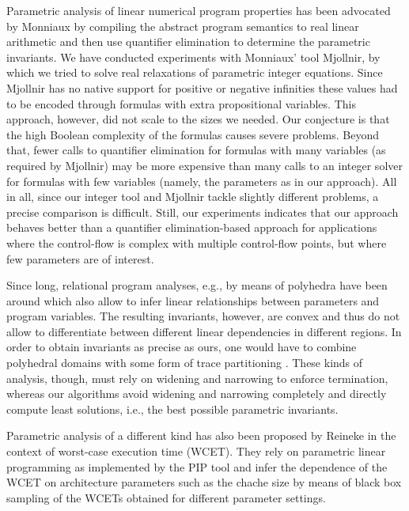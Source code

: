 \documentclass[a4paper]{easychair}
\begin{document}
Parametric analysis of linear numerical program properties has been advocated by Monniaux 
\cite{monniaux09,monniaux10} by compiling the abstract program semantics to real linear 
arithmetic and then use quantifier elimination to determine the parametric invariants.
We have conducted experiments with Monniaux' tool {\sc Mjollnir},
by which we tried to solve real relaxations of parametric integer equations.
Since {\sc Mjollnir} has no native support for positive or negative infinities 
these values had to be encoded through formulas with extra propositional variables.
This approach, however, did not scale to the sizes we needed.
Our conjecture is that the high Boolean complexity of the formulas causes severe problems.
Beyond that, fewer calls to quantifier elimination for formulas with many variables (as required
by {\sc Mjollnir}) may be more expensive than many calls to an integer solver for formulas
with few variables (namely, the parameters as in our approach).
All in all, since our integer tool  and {\sc Mjollnir}
tackle slightly different problems, a precise comparison is difficult. 
Still, our experiments indicates that our
approach behaves better than a quantifier elimination-based approach for applications where 
the control-flow is complex with multiple control-flow points, but where few parameters are of interest.

Since long, relational program analyses, e.g., by means of polyhedra have been around
\cite{DBLP:conf/popl/CousotH78,DBLP:journals/scp/BagnaraHZ08} which also allow to infer
linear relationships between parameters and program variables. 
The resulting invariants, however, are convex and thus do not allow to differentiate
between different linear dependencies in different regions.
In order to obtain invariants as precise as ours, one would have to combine polyhedral domains
with some form of trace partitioning \cite{mauborgne05trace}.
These kinds of analysis, though, must rely on widening and narrowing to enforce termination,
whereas our algorithms avoid widening and narrowing completely and directly compute 
least solutions, i.e., the best possible parametric invariants.

Parametric analysis of a different kind has also been proposed by Reineke \cite{Reineke14}
in the context of worst-case execution time (WCET). 
They rely on parametric linear programming as implemented by the PIP tool \cite{pip}
and infer the dependence of the WCET on architecture parameters such as the chache size 
by means of black box sampling of the WCETs obtained for different parameter settings.
\end{document}
